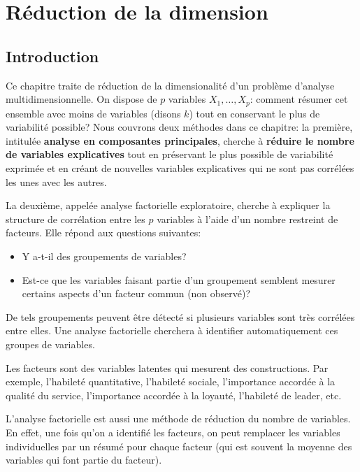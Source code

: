 \documentclass[
  11pt,
  letterpaper,
]{scrbook}
\providecommand{\tightlist}{%
  \setlength{\itemsep}{0pt}\setlength{\parskip}{0pt}}\usepackage{longtable,booktabs,array}
\theoremstyle{definition}
\theoremstyle{remark}
\begin{document}

\chapter{Réduction de la dimension}\label{analyse-factorielle}

\section{Introduction}\label{introduction-3}

Ce chapitre traite de réduction de la dimensionalité d'un problème
d'analyse multidimensionnelle. On dispose de \(p\) variables
\(X_1, \ldots, X_p\): comment résumer cet ensemble avec moins de
variables (disons \(k\)) tout en conservant le plus de variabilité
possible? Nous couvrons deux méthodes dans ce chapitre: la première,
intitulée \textbf{analyse en composantes principales}, cherche à
\textbf{réduire le nombre de variables explicatives} tout en préservant
le plus possible de variabilité exprimée et en créant de nouvelles
variables explicatives qui ne sont pas corrélées les unes avec les
autres.

La deuxième, appelée analyse factorielle exploratoire, cherche à
expliquer la structure de corrélation entre les \(p\) variables à l'aide
d'un nombre restreint de facteurs. Elle répond aux questions suivantes:

\begin{itemize}
\tightlist
\item
  Y a-t-il des groupements de variables?
\item
  Est-ce que les variables faisant partie d'un groupement semblent
  mesurer certains aspects d'un facteur commun (non observé)?
\end{itemize}

De tels groupements peuvent être détecté si plusieurs variables sont
très corrélées entre elles. Une analyse factorielle cherchera à
identifier automatiquement ces groupes de variables.

Les facteurs sont des variables latentes qui mesurent des constructions.
Par exemple, l'habileté quantitative, l'habileté sociale, l'importance
accordée à la qualité du service, l'importance accordée à la loyauté,
l'habileté de leader, etc.

L'analyse factorielle est aussi une méthode de réduction du nombre de
variables. En effet, une fois qu'on a identifié les facteurs, on peut
remplacer les variables individuelles par un résumé pour chaque facteur
(qui est souvent la moyenne des variables qui font partie du facteur).
\end{document}
